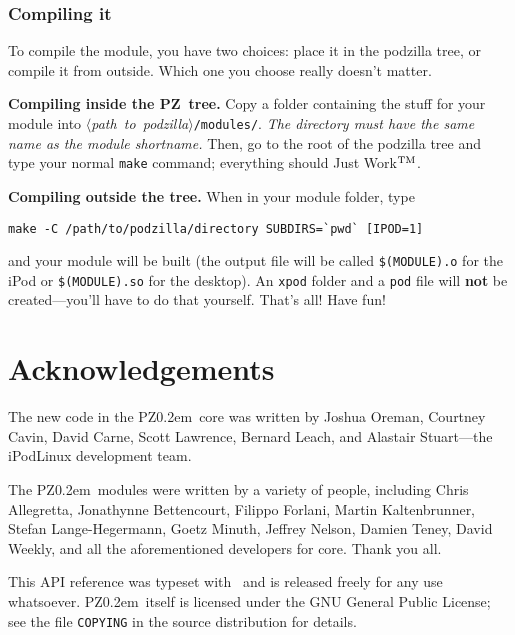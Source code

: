 \documentclass[12pt,letterpaper]{report}
\def\pz{{\footnotesize PZ}}
\def\pzt{\pz\kern0.2em{\large\oldstyle2}}
\let\ttt\tt
\def\tt{\def\_{{\ttt\char`\_}}\ttt}
\def\<#1>{\leavevmode\hbox{$\langle${\sl#1\/}$\rangle$}}
\begin{document}
\subsection{Compiling it}
To compile the module, you have two choices: place it in the podzilla tree, or compile it
from outside. Which one you choose really doesn't matter.

{\bf Compiling inside the \pz\ tree.} Copy a folder containing the stuff for your module
into \<path to podzilla>\verb|/modules/|. {\sl The directory must have the same name
as the module shortname.} Then, go to the root of the podzilla tree and type your normal
\verb|make| command; everything should Just Work$^{\rm TM}$.

{\bf Compiling outside the tree.} When in your module folder, type
\begin{verbatim}
make -C /path/to/podzilla/directory SUBDIRS=`pwd` [IPOD=1]
\end{verbatim}
and your module will be built (the output file will be called {\tt \$(MODULE).o} for the iPod or
{\tt \$(MODULE).so} for the desktop). An {\tt xpod} folder and a {\tt pod} file will {\bf not} be
created---you'll have to do that yourself.
\vskip1cm
{\centering\LARGE\sc That's all! Have fun!}

\chapter{Acknowledgements}
The new code in the \pzt\ core was written by Joshua Oreman, 
Courtney Cavin, David Carne, Scott Lawrence, Bernard Leach, and Alastair Stuart---the
iPodLinux development team.

The \pzt\ modules were written by a variety of people, including
Chris Allegretta,
Jonathynne Bettencourt,
Filippo Forlani,
Martin Kaltenbrunner,
Stefan Lange-Hegermann,
Goetz Minuth,
Jeffrey Nelson,
Damien Teney,
David Weekly,
and all the aforementioned developers for core. Thank you all.

This API reference was typeset with \LaTeXe\ and is released freely for any use whatsoever. \pzt\ itself
is licensed under the GNU General Public License; see the file \verb|COPYING| in the source
distribution for details.
\end{document}
